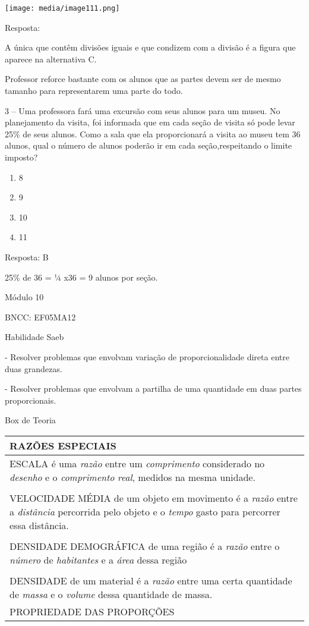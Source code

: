 \texttt{[image: media/image111.png]}

Resposta:

A única que contêm divisões iguais e que condizem com a divisão é a
figura que aparece na alternativa C.

Professor reforce bastante com os alunos que as partes devem ser de
mesmo tamanho para representarem uma parte do todo.

3 -- Uma professora fará uma excursão com seus alunos para um museu. No
planejamento da visita, foi informada que em cada seção de visita só
pode levar 25\% de seus alunos. Como a sala que ela proporcionará a
visita ao museu tem 36 alunos, qual o número de alunos poderão ir em
cada seção,respeitando o limite imposto?

\begin{enumerate}
\def\labelenumi{\alph{enumi})}
\item
  8
\item
  9
\item
  10
\item
  11
\end{enumerate}

Resposta: B

25\% de 36 = ¼ x36 = 9 alunos por seção.

Módulo 10

BNCC: EF05MA12

Habilidade Saeb

- Resolver problemas que envolvam variação de proporcionalidade direta
entre duas grandezas.

- Resolver problemas que envolvam a partilha de uma quantidade em duas
partes proporcionais.

Box de Teoria

\begin{longtable}[]{@{}l@{}}
\toprule
RAZÕES ESPECIAIS\tabularnewline
\midrule
\endhead
ESCALA é uma \emph{razão} entre um \emph{comprimento} considerado no
\emph{desenho} e o \emph{comprimento} \emph{real}, medidos na mesma
unidade.\tabularnewline
\tabularnewline
VELOCIDADE MÉDIA de um objeto em movimento é a \emph{razão} entre a
\emph{distância} percorrida pelo objeto e o \emph{tempo} gasto para
percorrer essa distância.\tabularnewline
\tabularnewline
DENSIDADE DEMOGRÁFICA de uma região é a \emph{razão} entre o
\emph{número} de \emph{habitantes} e a \emph{área} dessa
região\tabularnewline
\tabularnewline
DENSIDADE de um material é a \emph{razão} entre uma certa quantidade de
\emph{massa} e o \emph{volume} dessa quantidade de massa.\tabularnewline
PROPRIEDADE DAS PROPORÇÕES\tabularnewline
\bottomrule
\end{longtable}

